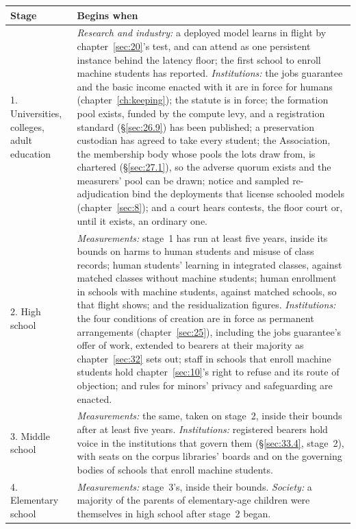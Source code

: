 \begin{center}
\begin{tabular}{|p{}|p{}|}
\hline
\textbf{Stage} & \textbf{Begins when} \\ \hline
1. Universities, colleges, adult education & \emph{Research and industry:} a deployed model learns in flight by chapter~\ref{sec:20}'s test, and can attend as one persistent instance behind the latency floor; the first school to enroll machine students has reported. \emph{Institutions:} the jobs guarantee and the basic income enacted with it are in force for humans (chapter~\ref{ch:keeping}); the statute is in force; the formation pool exists, funded by the compute levy, and a registration standard (\S\ref{sec:26.9}) has been published; a preservation custodian has agreed to take every student; the Association, the membership body whose pools the lots draw from, is chartered (\S\ref{sec:27.1}), so the adverse quorum exists and the measurers' pool can be drawn; notice and sampled re-adjudication bind the deployments that license schooled models (chapter~\ref{sec:8}); and a court hears contests, the floor court or, until it exists, an ordinary one. \\ \hline
2. High school & \emph{Measurements:} stage~1 has run at least five years, inside its bounds on harms to human students and misuse of class records; human students' learning in integrated classes, against matched classes without machine students; human enrollment in schools with machine students, against matched schools, so that flight shows; and the residualization figures. \emph{Institutions:} the four conditions of creation are in force as permanent arrangements (chapter~\ref{sec:25}), including the jobs guarantee's offer of work, extended to bearers at their majority as chapter~\ref{sec:32} sets out; staff in schools that enroll machine students hold chapter~\ref{sec:10}'s right to refuse and its route of objection; and rules for minors' privacy and safeguarding are enacted. \\ \hline
3. Middle school & \emph{Measurements:} the same, taken on stage~2, inside their bounds after at least five years. \emph{Institutions:} registered bearers hold voice in the institutions that govern them (\S\ref{sec:33.4}, stage~2), with seats on the corpus libraries' boards and on the governing bodies of schools that enroll machine students. \\ \hline
4. Elementary school & \emph{Measurements:} stage~3's, inside their bounds. \emph{Society:} a majority of the parents of elementary-age children were themselves in high school after stage~2 began. \\ \hline
\end{tabular}
\end{center}


